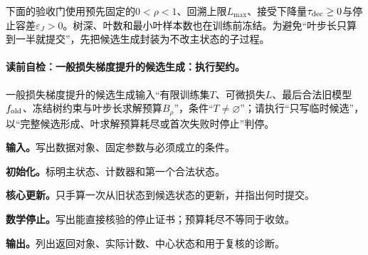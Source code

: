 \label{struct:V3-C03-CH24}
下面的验收门使用预先固定的$0<\rho<1$、回溯上限$L_{\max}$、接受下降量$\tau_{\rm dec}\geq0$与停止容差$\varepsilon_J>0$。树深、叶数和最小叶样本数也在训练前冻结。为避免“叶步长只算到一半就提交”，先把候选生成封装为不改主状态的子过程。

\paragraph{读前自检：一般损失梯度提升的候选生成：执行契约。}一般损失梯度提升的候选生成输入“有限训练集$T$、可微损失$L$、最后合法旧模型$f_{\rm old}$、冻结树约束与叶步长求解预算$B_\rho$”，条件“$T\ne\varnothing$”；请执行“只写临时候选”，以“完整候选形成、叶求解预算耗尽或首次失败时停止”判停。\par
\begin{keypointbox}[title={一般损失梯度提升的候选生成：五步阅读}]
\textbf{输入。}写出数据对象、固定参数与必须成立的条件。\par
\textbf{初始化。}标明主状态、计数器和第一个合法状态。\par
\textbf{核心更新。}只手算一次从旧状态到候选状态的更新，并指出何时提交。\par
\textbf{数学停止。}写出能直接核验的停止证书；预算耗尽不等同于收敛。\par
\textbf{输出。}列出返回对象、实际计数、中心状态和用于复核的诊断。
\end{keypointbox}

